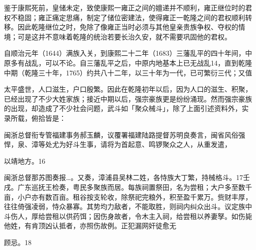鉴于康熙死前，皇储未定，致使康熙一雍正之间的嬗递并不顺利，雍正继位时的君权不稳固；雍正痛定思痛，制定了储位密建法，使得雍正一乾隆之间的君权顺利转移。因此乾隆继位之时，免除了像雍正当时必须与其他皇亲贵族争权、夺权的情境；可是这并不意味着乾隆的统治若要长治久安，就不需要巩固他的君权。

自顺治元年（1644）满族入关，到康熙二十二年（1683）三藩乱平的四十年间，中原多有战乱，可以不论。自三藩乱平之后，中原内地基本上已无战乱14，直到乾隆中期（乾隆三十年，1765）约共八十二年，以三十年为一代，已可繁衍三代；又值

\vfill
\begin{BookNotes}
\end{BookNotes}

\noindent 太平盛世，人口滋生，户口殷繁。因此在乾隆初年以后，因为人口的滋生、积聚，已经出现了不少大姓家族；接近中期以后，强宗豪族更是纷纷涌现。然而强宗豪族的出现，却造成了不少社会问题，武斗如「聚众械斗」，除了上面引述资料外，实录所载，俯拾皆是：

\begin{BookQuote}
闽浙总督衔专管福建事务郝玉麟，议覆署福建陆路提督苏明良奏言，闽省风俗强悍，泉、漳等处尤为好斗生事，请将为首起意、鸣锣聚众之人，从重发遣，
\end{BookQuote}

以靖地方。16

\begin{BookQuote}
闽浙总督那苏图奏报…。又奏，漳浦县吴林二姓，各恃族大丁繁，持械格斗。17壬戌。广东巡抚王检奏，粤民多聚族而居。每族祠置祭田，名为尝租；大户多至数千亩，小户亦有数百亩。租谷按支轮收，除祭祀完粮外，积至盈千累万。赀财丰厚，往往倚强凌弱，恃众暴寡。其势均力敌者，不能取胜，则祠内纠众出斗。议定族中斗伤人，厚给尝租以供药饵；因伤身故者，令木主入祠，给尝租以养妻孥。如伤毙他姓，有肯顶凶认抵者，亦照伤故例。正犯漏网奸徒愈无
\end{BookQuote}

顾忌。18

